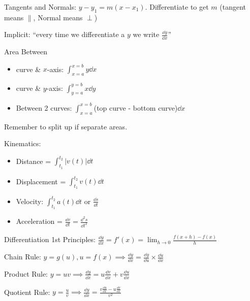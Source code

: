 \documentclass[10pt,a4paper,oneside]{book}
\begin{document}
Tangents and Normals: $y-y_1=m(x-x_1)$. Differentiate to get $m$ (tangent means $\parallel$, Normal means $\perp$)

Implicit: ``every time we differentiate a $y$ we write $\frac{\dd y}{\dd x}$''

Area Between
\begin{itemize}
    \item curve \& $x$-axis: $\int_{x=a}^{x=b}y\dd x$
    \item curve \& $y$-axis: $\int_{y=a}^{y=b}x\dd y$
    \item Between 2 curves: $\int_{x=a}^{x=b}$(top curve - bottom curve)$\dd x$
\end{itemize}
Remember to split up if separate areas.

Kinematics:
\begin{itemize}
    \item Distance = $\int_{t_1}^{t_2}|v(t)|\dd t$
    \item Displacement = $\int_{t_1}^{t_2}v(t)\dd t$
    \item Velocity: $\int_{t_1}^{t_2}a(t)\dd t$ or $\frac{\dd s}{\dd t}$
    \item Acceleration = $\frac{\dd v}{\dd t}=\frac{\dd^2 s}{\dd t^2}$
\end{itemize}

Differentiation 1st Principles: $\frac{\dd y}{\dd x}=f'(x)=\lim_{h\to 0}\frac{f(x+h)-f(x)}{h}$

Chain Rule: $y=g(u), u=f(x)\implies \frac{\dd y}{\dd x}=\frac{\dd y}{\dd u}\times \frac{\dd u}{\dd x}$

Product Rule: $y=uv \implies \frac{\dd y}{\dd x}=u\frac{\dd v}{\dd x}+v\frac{\dd u}{\dd x}$

Quotient Rule: $y=\frac{u}{v}\implies \frac{\dd y}{\dd x}=\frac{v\frac{\dd u}{\dd x}-u\frac{\dd v}{\dd x}}{v^2}$
\end{document}
